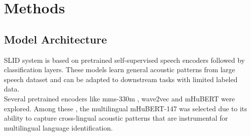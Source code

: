 \documentclass[11pt]{article}
\begin{document}
\section{Methods}

\subsection{Model Architecture}
SLID system is based on pretrained self-supervised speech encoders followed by classification layers. These models learn general acoustic patterns from large speech dataset and can be adapted to downstream tasks with limited labeled data.
\\ Several pretrained encoders like mms-330m \cite{pratap2023scalingspeechtechnology1000}, wave2vec and mHuBERT were explored. Among these , the multilingual mHuBERT-147 was selected \citep{boito2024mhubert147compactmultilingualhubert} due to its ability to capture cross-lingual acoustic patterns that are instrumental for multilingual language identification.
\end{document}
